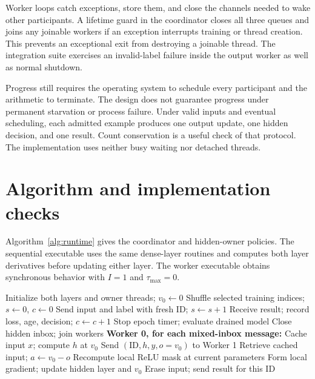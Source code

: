 \documentclass[conference]{IEEEtran}
\newcommand{\taumax}{\tau_{\max}}
\begin{document}
Worker loops catch exceptions, store them, and close the channels needed to wake other participants. A lifetime guard in the coordinator closes all three queues and joins any joinable workers if an exception interrupts training or thread creation. This prevents an exceptional exit from destroying a joinable thread. The integration suite exercises an invalid-label failure inside the output worker as well as normal shutdown.

Progress still requires the operating system to schedule every participant and the arithmetic to terminate. The design does not guarantee progress under permanent starvation or process failure. Under valid inputs and eventual scheduling, each admitted example produces one output update, one hidden decision, and one result. Count conservation is a useful check of that protocol. The implementation uses neither busy waiting nor detached threads.

\section{Algorithm and implementation checks}
Algorithm~\ref{alg:runtime} gives the coordinator and hidden-owner policies. The sequential executable uses the same dense-layer routines and computes both layer derivatives before updating either layer. The worker executable obtains synchronous behavior with $I=1$ and $\taumax=0$.

\begin{algorithm}[t]
\caption{Bounded delayed-gradient training}\label{alg:runtime}
\begin{algorithmic}[1]
\State Initialize both layers and owner threads; $v_0\gets0$
 \State Shuffle selected training indices; $s\gets0$, $c\gets0$
   \State Send input and label with fresh ID; $s\gets s+1$
  \EndWhile
  \State Receive result; record loss, age, decision; $c\gets c+1$
 \EndWhile
 \State Stop epoch timer; evaluate drained model
\EndFor
\State Close hidden inbox; join workers
\Statex \textbf{Worker 0, for each mixed-inbox message:}
 \State Cache input $x$; compute $h$ at $v_0$
 \State Send $(\mathrm{ID},h,y,o=v_0)$ to Worker 1
\Else
 \State Retrieve cached input; $a\gets v_0-o$
 \If{$a\leq\taumax$}
  \State Recompute local ReLU mask at current parameters
  \State Form local gradient; update hidden layer and $v_0$
 \EndIf
 \State Erase input; send result for this ID
\EndIf
\end{algorithmic}
\end{algorithm}
\end{document}
